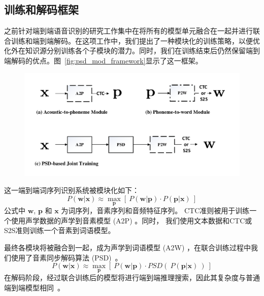 \subsection{训练和解码框架}
\label{sec:psd_mod_framework}

之前针对端到端语音识别的研究工作集中在将所有的模型单元融合在一起并进行联合训练和端到端解码。在这项工作中，我们提出了一种模块化的训练策略，以便优化外在知识源分别训练各个子模块的潜力。同时，我们在训练结束后仍然保留端到端解码的优点。图~\ref{fig:psd_mod_framework}显示了这一框架。


\begin{figure}[!htp]
  \centering
    \captionstyle{\centering}
    \includegraphics[width=\textwidth]{figure/psd_mod_framework.pdf}
\end{figure}


这一端到端词序列识别系统被模块化如下：
\begin{equation}
\label{equ:framework-1}
P(\mathbf{w}|\mathbf{x})\approx\max_{\mathbf{p}} \left[\ P(\mathbf{w}|\mathbf{p}) \cdot P(\mathbf{p}|\mathbf{x})\ \right]
\end{equation}
公式中 $\mathbf{w}$, $\mathbf{p}$ 和 $\mathbf{x}$ 为词序列，音素序列和音频特征序列。
CTC准则被用于训练一个使用声学数据的声学到音素模型 (A2P)  。同时， 我们使用文本数据和CTC或S2S准则训练一个音素到词语模型。

最终各模块将被融合到一起，成为声学到词语模型 (A2W) ，在联合训练过程中我们使用了音素同步解码算法 (PSD)~\cite{zhc00-chen-tasl2017}。
\begin{equation}
\label{equ:framework-2}
P(\mathbf{w}|\mathbf{x})\approx \max_{\mathbf{p}}\left[\ P(\mathbf{w}|\mathbf{p}) \cdot PSD(\ P(\mathbf{p}|\mathbf{x})\ )\ \right]
\end{equation}
在解码阶段，经过联合训练后的模型将进行端到端推理搜索，因此其复杂度与普通端到端模型相同~\cite{audhkhasi2017direct}。

